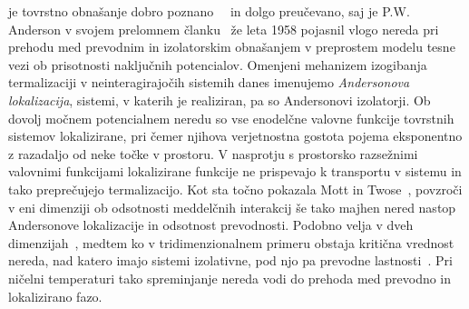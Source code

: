 je tovrstno
obnašanje dobro poznano~\cite{lagendijk2009fifty}~\cite{abrahams201050} in dolgo preučevano, saj je P.W. Anderson v svojem prelomnem članku~\cite{anderson1958absence} že leta 1958 pojasnil vlogo nereda pri prehodu med prevodnim 
in izolatorskim obnašanjem v preprostem modelu tesne vezi ob prisotnosti naključnih potencialov. Omenjeni mehanizem izogibanja termalizaciji v neinteragirajočih sistemih danes imenujemo \emph{Andersonova lokalizacija}, sistemi, v katerih je realiziran, pa so Andersonovi izolatorji. Ob dovolj močnem potencialnem neredu so vse enodelčne valovne funkcije tovrstnih sistemov lokalizirane, pri čemer njihova verjetnostna gostota pojema eksponentno z razadaljo od neke točke v prostoru. V nasprotju s prostorsko razsežnimi valovnimi funkcijami 
lokalizirane 
funkcije ne
 prispevajo k transportu v sistemu in tako preprečujejo termalizacijo. Kot sta točno pokazala Mott in Twose~\cite{doi:10.1080/00018736100101271}, povzroči v eni dimenziji ob odsotnosti meddelčnih interakcij še tako majhen nered nastop Andersonove lokalizacije in odsotnost prevodnosti. Podobno velja v dveh dimenzijah~\cite{abrahams1979scaling}, medtem ko v tridimenzionalnem primeru obstaja kritična vrednost nereda, nad katero imajo sistemi izolativne, pod njo pa prevodne lastnosti~\cite{mott1990metal}. Pri ničelni temperaturi tako spreminjanje nereda vodi do prehoda med prevodno in lokalizirano fazo. \\\\
